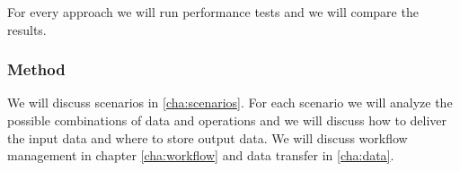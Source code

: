 For every approach we will run performance tests and we will compare the results.

\subsubsection{Method}
We will discuss scenarios in \ref{cha:scenarios}. For each scenario we will analyze the possible combinations 
of data and operations and we will discuss how to 
deliver the input data and where to store output data. We will discuss workflow management in chapter 
\ref{cha:workflow} and data transfer in \ref{cha:data}.


